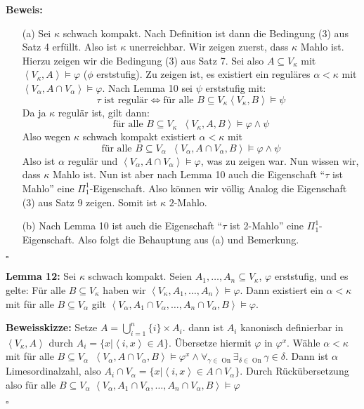 \documentclass[a4paper,fontsize=11pt]{scrartcl}
\newcommand{\On}{\operatorname{On}}
\begin{document}
{\bf Beweis:}
\begin{itemize}
\item[(a)] Sei $\kappa$ schwach kompakt. Nach Definition ist dann die
  Bedingung (3) aus Satz 4 erfüllt. Also ist $\kappa$
  unerreichbar. Wir zeigen zuerst, dass $\kappa$ Mahlo ist. Hierzu
  zeigen wir die Bedingung (3) aus Satz 7. Sei also $A\subseteq
  V_\kappa$ mit $\left<V_\kappa,A\right>\models\varphi$ ($\phi$
  erststufig). Zu zeigen ist, es existiert ein reguläres
  $\alpha<\kappa$ mit $\left<V_\alpha,A\cap
  V_\alpha\right>\models\varphi$. Nach Lemma 10 sei $\psi$ erststufig
  mit:
  $$ \tau\mbox{ ist regulär}\Leftrightarrow\mbox{für alle }B\subseteq
  V_\kappa\left<V_\kappa,B\right>\models\psi$$
  Da ja $\kappa$ regulär ist, gilt dann:
  $$ \mbox{für alle }B\subseteq
  V_\kappa\phantom{a}\left<V_\kappa,A,B\right>\models\varphi\wedge\psi$$
  Also wegen $\kappa$ schwach kompakt existiert $\alpha<\kappa$ mit
  $$ \mbox{für alle }B\subseteq
  V_\alpha\phantom{a}\left<V_\alpha,A\cap
  V_\alpha,B\right>\models\varphi\wedge\psi$$ Also ist $\alpha$
  regulär und $\left<V_\alpha,A\cap V_\alpha\right>\models\varphi$,
  was zu zeigen war. Nun wissen wir, dass $\kappa$ Mahlo ist. Nun ist
  aber nach Lemma 10 auch die Eigenschaft ``$\tau$ ist Mahlo'' eine
  $\Pi_1^1$-Eigenschaft. Also können wir völlig Analog die Eigenschaft
  (3) aus Satz 9 zeigen. Somit ist $\kappa$ $2$-Mahlo.
\item[(b)] Nach Lemma 10 ist auch die Eigenschaft ``$\tau$ ist
  2-Mahlo'' eine $\Pi_1^1$-Eigenschaft. Also folgt die Behauptung aus
  (a) und Bemerkung.
\end{itemize}

\hfill $\square$

{\bf Lemma 12:} Sei $\kappa$ schwach kompakt. Seien
$A_1,\ldots,A_n\subseteq V_\kappa$, $\varphi$ erststufig, und es
gelte: Für alle $B\subseteq V_\kappa$ haben wir
$\left<V_\kappa,A_1,\ldots,A_n\right>\models\varphi$. Dann existiert
ein $\alpha<\kappa$ mit für alle $B\subseteq V_\alpha$ gilt
$\left<V_\alpha,A_1\cap V_\alpha,\ldots,A_n\cap
V_\alpha,B\right>\models\varphi$.

{\bf Beweisskizze:} Setze $A=\bigcup_{i=1}^{n}\{i\}\times A_i$. dann
ist $A_i$ kanonisch definierbar in $\left<V_\kappa,A\right>$ durch
$A_i=\{x|\left<i,x\right>\in A\}$. Übersetze hiermit $\varphi$ in
$\varphi^x$. Wähle $\alpha<\kappa$ mit für alle $B\subseteq
V_\alpha\phantom{a}\left<V_\alpha,A\cap
V_\alpha,B\right>\models\varphi^x \wedge
\forall_{\gamma\in\On}\exists_{\delta\in\On}\gamma\in\delta$. Dann ist
$\alpha$ Limesordinalzahl, also $A_i\cap
V_\alpha=\{x|\left<i,x\right>\in A\cap V_\alpha\}$. Durch
Rückübersetzung also für alle $B\subseteq V_\alpha$
$\left<V_\alpha,A_1\cap V_\alpha,\ldots,A_n\cap
V_\alpha,B\right>\models\varphi$

\hfill $\square$
\end{document}
